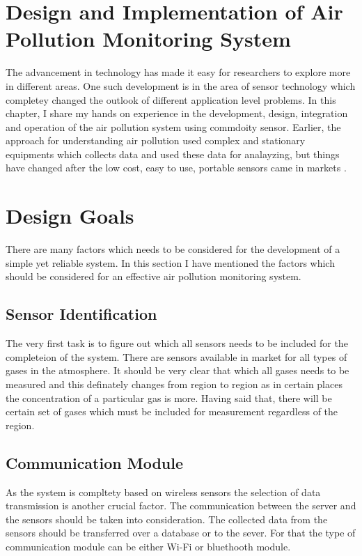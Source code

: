 \documentclass[11pt]{article}
\begin{document}
\section*{Design and Implementation of Air Pollution Monitoring System}

The advancement in technology has made it easy for researchers to explore more in different areas. One such development is in the area of sensor technology which completey changed the outlook of different application level problems. In this chapter, I share my hands on experience in the development, design, integration and operation of the air pollution system using commdoity sensor. Earlier, the approach for understanding air pollution used complex and stationary equipments which collects data and used these data for analayzing, but things have changed after the low cost, easy to use, portable sensors came in markets \cite{Snyder2013}. 

\section*{Design Goals}

There are many factors which needs to be considered for the development of a simple yet reliable system. In this section I have mentioned the factors which should be considered for an effective air pollution monitoring system.

\subsection{Sensor Identification}

The very first task is to figure out which all sensors needs to be included for the completeion of the system. There are sensors available in market for all types of gases in the atmosphere. It should be very clear that which all gases needs to be measured and this definately changes from region to region as in certain places the concentration of a particular gas is more. Having said that, there will be certain set of gases which must be included for measurement regardless of the region.

\subsection{Communication Module}

As the system is compltety based on wireless sensors the selection of data transmission is another crucial factor. The communication between the server and the sensors should be taken into consideration.
The collected data from the sensors should be transferred over a database or to the sever. For that the type of communication module can be either Wi-Fi or bluethooth module.
\end{document}
